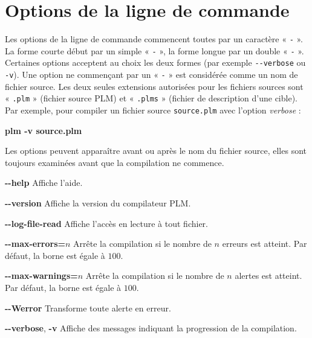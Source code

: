 

\newcommand\OPTION[1]{\colorbox{gray!15}{#1}}


\chapter{Options de la ligne de commande}

Les options de la ligne de commande commencent toutes par un caractère « \texttt{-} ». La forme courte début par un simple « \texttt{-} », la forme longue par un double « \texttt{-} ». Certaines options acceptent au choix les deux formes (par exemple \texttt{-{}-verbose} ou \texttt{-v}). Une option ne commençant par un « \texttt{-} » est considérée comme un nom de fichier source. Les deux seules extensions autorisées pour les fichiers sources sont « \texttt{.plm} » (fichier source PLM) et  « \texttt{.plms} » (fichier de description d'une cible). Par exemple, pour compiler un fichier source \texttt{source.plm} avec l'option \emph{verbose} :

\begin{SHELL}
\bfseries plm -v source.plm
\end{SHELL}

Les options peuvent apparaître avant ou après le nom du fichier source, elles sont toujours examinées avant que la compilation ne commence.



\OPTION{\ttfamily\bfseries-{}-help} Affiche l'aide.


\OPTION{\ttfamily\bfseries-{}-version} Affiche la version du compilateur PLM.



\OPTION{\ttfamily\bfseries-{}-log-file-read} Affiche l'accès en lecture à tout fichier.

\OPTION{\ttfamily\bfseries-{}-max-errors=$n$} Arrête la compilation si le nombre de $n$ erreurs est atteint. Par défaut, la borne est égale à $100$.

\OPTION{\ttfamily\bfseries-{}-max-warnings=$n$} Arrête la compilation si le nombre de $n$ alertes est atteint. Par défaut, la borne est égale à $100$.

\OPTION{\ttfamily\bfseries-{}-Werror} Transforme toute alerte en erreur.

\OPTION{\ttfamily\bfseries-{}-verbose}, \OPTION{\ttfamily\bfseries-v} Affiche des messages indiquant la progression de la compilation.








